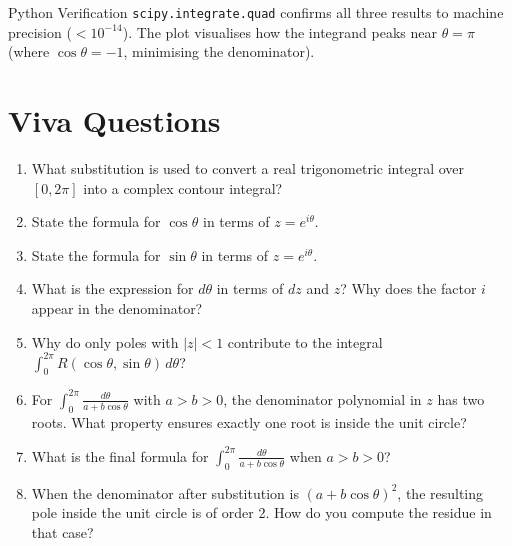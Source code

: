 \documentclass[12pt,a4paper]{article}
\begin{document}
\begin{learnbox}{Python Verification}
\texttt{scipy.integrate.quad} confirms all three results to machine precision
($< 10^{-14}$). The plot visualises how the integrand peaks near $\theta = \pi$
(where $\cos\theta = -1$, minimising the denominator).
\end{learnbox}

\section{Viva Questions}

\begin{enumerate}
  \item What substitution is used to convert a real trigonometric integral over
        $[0,2\pi]$ into a complex contour integral?

  \item State the formula for $\cos\theta$ in terms of $z = e^{i\theta}$.

  \item State the formula for $\sin\theta$ in terms of $z = e^{i\theta}$.

  \item What is the expression for $d\theta$ in terms of $dz$ and $z$? Why does
        the factor $i$ appear in the denominator?

  \item Why do only poles with $|z| < 1$ contribute to the integral
        $\displaystyle\int_0^{2\pi} R(\cos\theta,\sin\theta)\,d\theta$?

  \item For $\displaystyle\int_0^{2\pi}\frac{d\theta}{a+b\cos\theta}$ with
        $a > b > 0$, the denominator polynomial in $z$ has two roots. What
        property ensures exactly one root is inside the unit circle?

  \item What is the final formula for $\displaystyle\int_0^{2\pi}\frac{d\theta}{a+b\cos\theta}$
        when $a > b > 0$?

  \item When the denominator after substitution is $(a + b\cos\theta)^2$, the
        resulting pole inside the unit circle is of order 2. How do you compute
        the residue in that case?
\end{enumerate}
\end{document}
